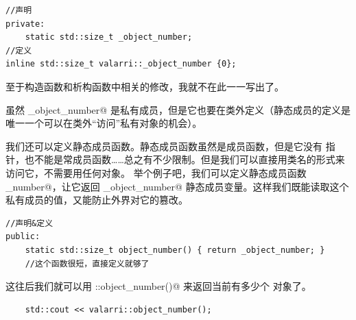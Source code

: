\begin{lstlisting}
//声明
private:
    static std::size_t _object_number;
//定义
inline std::size_t valarri::_object_number {0};
\end{lstlisting}
至于构造函数和析构函数中相关的修改，我就不在此一一写出了。\par
虽然 \lstinline@_object_number@ 是私有成员，但是它也要在类外定义（静态成员的定义是唯一一个可以在类外``访问''私有对象的机会）。\par
我们还可以定义静态成员函数。静态成员函数虽然是成员函数，但是它没有 \lstinline@this@ 指针，也不能是常成员函数……总之有不少限制。但是我们可以直接用类名的形式来访问它，不需要用任何对象。
举个例子吧，我们可以定义静态成员函数 \lstinline@object_number@，让它返回 \lstinline@_object_number@ 静态成员变量。这样我们既能读取这个私有成员的值，又能防止外界对它的篡改。
\begin{lstlisting}
//声明&定义
public:
    static std::size_t object_number() { return _object_number; }
    //这个函数很短，直接定义就够了
\end{lstlisting}
这往后我们就可以用 \lstinline@valarri::object_number()@ 来返回当前有多少个 \lstinline@valarri@ 对象了。\par
\begin{lstlisting}
    std::cout << valarri::object_number();
\end{lstlisting}\par
